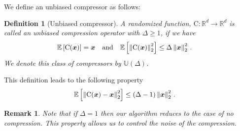 \documentclass[twoside]{article}
\newtheorem{remark}{Remark}
\newtheorem{definition}{Definition}
\begin{document}
We define an unbiased compressor as follows:
\begin{definition}[Unbiased compressor]
A randomized function, $\text{C}:\mathbb{R}^{d}\rightarrow\mathbb{R}^{d}$ is called an unbiased compression operator with $\Delta\geq 1$, if we have 
\begin{align}\notag
\mathbb{E}\left[\text{C}(\boldsymbol{x})\right]&=\boldsymbol{x}\nonumber \quad \textrm{and} \quad    \mathbb{E}\left[\left\|\text{C}(\boldsymbol{x})\right\|^2_2\right] \leq \Delta\left\|\boldsymbol{x}\right\|^2_2\notag \, .
\end{align}
We denote this class of compressors by $\mathbb{U}(\Delta)$.
\end{definition}
This definition leads to the following property 
\begin{align}\notag
    \mathbb{E}\left[\left\|\text{C}(\boldsymbol{x})-\boldsymbol{x}\right\|^2_2\right]&\leq \left(\Delta-1\right)\left\|\boldsymbol{x}\right\|^2_2\, .
\end{align}
\begin{remark}
Note that if $\Delta=1$ then our algorithm reduces to the case of no compression. 
This property allows us to control the noise of the compression.
\end{remark}
\end{document}
